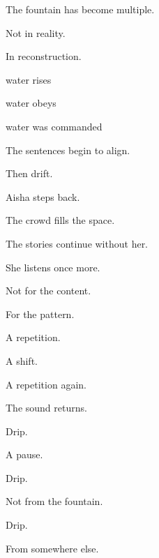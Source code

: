 \medskip

The fountain has become multiple.

Not in reality.

In reconstruction.

\medskip

 water rises

 water obeys

 water was commanded

\medskip

The sentences begin to align.

Then drift.

\medskip

Aisha steps back.

The crowd fills the space.

The stories continue without her.

\medskip

She listens once more.

Not for the content.

For the pattern.

\medskip

A repetition.

A shift.

A repetition again.

\medskip


\medskip

The sound returns.

\medskip

Drip.

\medskip

A pause.

\medskip

Drip.

\medskip

Not from the fountain.

\medskip

Drip.

\medskip

From somewhere else.
